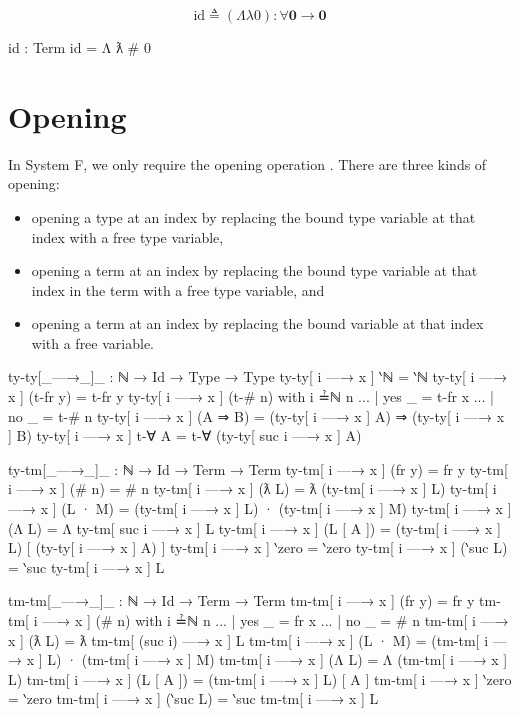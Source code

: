 \documentclass[logo,bsc,singlespacing,parskip,online]{infthesis}
\begin{document}
\begin{equation*}
  \text{id} \triangleq (\Lambda \lambda 0) \colon \forall \mathbf{0} \to \mathbf{0}
\end{equation*}
\begin{code}
  id : Term
  id = Λ ƛ # 0
\end{code}

\section{Opening}
In System F, we only require the opening operation \citep{chargueraud_locally_2012}. There are three
kinds of opening:
\begin{itemize}
  \item opening a type at an index by replacing the bound type variable at that index with a free
        type variable,
  \item opening a term at an index by replacing the bound type variable at that index in the term
        with a free type variable, and
  \item opening a term at an index by replacing the bound variable at that index with a free
        variable.
\end{itemize}

\begin{code}
  ty-ty[_—→_]_ : ℕ → Id → Type → Type
  ty-ty[ i —→ x ] ‵ℕ = ‵ℕ
  ty-ty[ i —→ x ] (t-fr y) = t-fr y
  ty-ty[ i —→ x ] (t-# n) with i ≟ℕ n
  ... | yes _ = t-fr x
  ... | no  _ = t-# n
  ty-ty[ i —→ x ] (A ⇒ B) = (ty-ty[ i —→ x ] A) ⇒ (ty-ty[ i —→ x ] B)
  ty-ty[ i —→ x ] t-∀ A = t-∀ (ty-ty[ suc i —→ x ] A)

  ty-tm[_—→_]_ : ℕ → Id → Term → Term
  ty-tm[ i —→ x ] (fr y) = fr y
  ty-tm[ i —→ x ] (# n) = # n
  ty-tm[ i —→ x ] (ƛ L) = ƛ (ty-tm[ i —→ x ] L)
  ty-tm[ i —→ x ] (L · M) = (ty-tm[ i —→ x ] L) · (ty-tm[ i —→ x ] M)
  ty-tm[ i —→ x ] (Λ L) = Λ ty-tm[ suc i —→ x ] L
  ty-tm[ i —→ x ] (L [ A ]) = (ty-tm[ i —→ x ] L) [ (ty-ty[ i —→ x ] A) ]
  ty-tm[ i —→ x ] ‵zero = ‵zero
  ty-tm[ i —→ x ] (‵suc L) = ‵suc ty-tm[ i —→ x ] L

  tm-tm[_—→_]_ : ℕ → Id → Term → Term
  tm-tm[ i —→ x ] (fr y) = fr y
  tm-tm[ i —→ x ] (# n) with i ≟ℕ n
  ... | yes _ = fr x
  ... | no  _ = # n
  tm-tm[ i —→ x ] (ƛ L) = ƛ tm-tm[ (suc i) —→ x ] L
  tm-tm[ i —→ x ] (L · M) =
    (tm-tm[ i —→ x ] L) · (tm-tm[ i —→ x ] M)
  tm-tm[ i —→ x ] (Λ L) = Λ (tm-tm[ i —→ x ] L)
  tm-tm[ i —→ x ] (L [ A ]) = (tm-tm[ i —→ x ] L) [ A ]
  tm-tm[ i —→ x ] ‵zero = ‵zero
  tm-tm[ i —→ x ] (‵suc L) = ‵suc tm-tm[ i —→ x ] L
\end{code}
\end{document}
